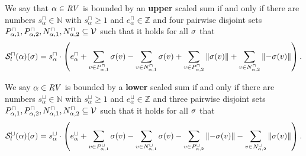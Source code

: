 \begin{definition}
  We say that $\alpha \in \mathit{RV}$ is bounded by an \textbf{upper} scaled sum if and only if there are numbers $s^\sqcap_\alpha \in \mathbb{N}$ with $s^\sqcap_\alpha \geq 1$ and $e^\sqcap_\alpha \in \mathbb{Z}$ and four pairwise disjoint sets $P_{\alpha,1}^\sqcap, P_{\alpha,2}^\sqcap, N_{\alpha,1}^\sqcap, N_{\alpha,2}^\sqcap \subseteq \mathcal{V}$ such that it holds for all $\sigma$ that
  \[ {\mathcal{S}^\sqcap_l}(\alpha)(\sigma) =
    s^\sqcap_\alpha \cdot \left(
        e^\sqcap_\alpha
      + \sum_{v \in P_{\alpha,1}^\sqcap} \sigma(v)
      - \sum_{v \in N_{\alpha,1}^\sqcap} \sigma(v)
      + \sum_{v \in P_{\alpha,2}^\sqcap} \left\Vert\sigma(v)\right\Vert
      + \sum_{v \in N_{\alpha,2}^\sqcap} \left\Vert-\sigma(v)\right\Vert
    \right). \]

  We say $\alpha \in \mathit{RV}$ is bounded by a \textbf{lower} scaled sum if and only if there are numbers $s^\sqcup_\alpha \in \mathbb{N}$ with $s^\sqcup_\alpha \geq 1$ and $e^\sqcup_\alpha \in \mathbb{Z}$ and three pairwise disjoint sets $P_{\alpha,1}^\sqcap, P_{\alpha,2}^\sqcap, N_{\alpha,1}^\sqcap, N_{\alpha,2}^\sqcap \subseteq \mathcal{V}$ such that it holds for all $\sigma$ that
  \[ {\mathcal{S}^\sqcup_l}(\alpha)(\sigma) =
    s^\sqcup_\alpha \cdot \left(
      e^\sqcup_\alpha
    + \sum_{v \in P_{\alpha,1}^\sqcup} \sigma(v)
    - \sum_{v \in N_{\alpha,1}^\sqcup} \sigma(v)
    - \sum_{v \in P_{\alpha,2}^\sqcup} \left\Vert-\sigma(v)\right\Vert
    - \sum_{v \in N_{\alpha,2}^\sqcup} \left\Vert\sigma(v)\right\Vert
  \right). \]
\end{definition}



